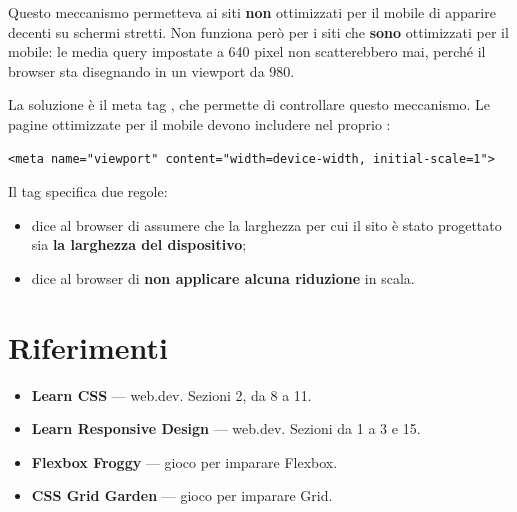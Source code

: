 Questo meccanismo permetteva ai siti \textbf{non} ottimizzati per il mobile di
apparire decenti su schermi stretti. Non funziona però per i siti che
\textbf{sono} ottimizzati per il mobile: le media query impostate a 640 pixel
non scatterebbero mai, perché il browser sta disegnando in un viewport da 980.

La soluzione è il meta tag , che permette di controllare questo
meccanismo. Le pagine ottimizzate per il mobile devono includere nel proprio
:

\begin{lstlisting}[style=html, name=viewport]
<meta name="viewport" content="width=device-width, initial-scale=1">
\end{lstlisting}

Il tag specifica due regole:

\begin{itemize}
  \item {} dice al browser di assumere che la larghezza
        per cui il sito è stato progettato sia \textbf{la larghezza del
        dispositivo};
  \item {} dice al browser di \textbf{non applicare alcuna
        riduzione} in scala.
\end{itemize}


\section{Riferimenti}

\begin{itemize}
  \item \textbf{Learn CSS} --- web.dev. Sezioni 2, da 8 a 11. \\
  \item \textbf{Learn Responsive Design} --- web.dev. Sezioni da 1 a 3 e 15. \\
  \item \textbf{Flexbox Froggy} --- gioco per imparare Flexbox. \\
  \item \textbf{CSS Grid Garden} --- gioco per imparare Grid. \\
\end{itemize}
